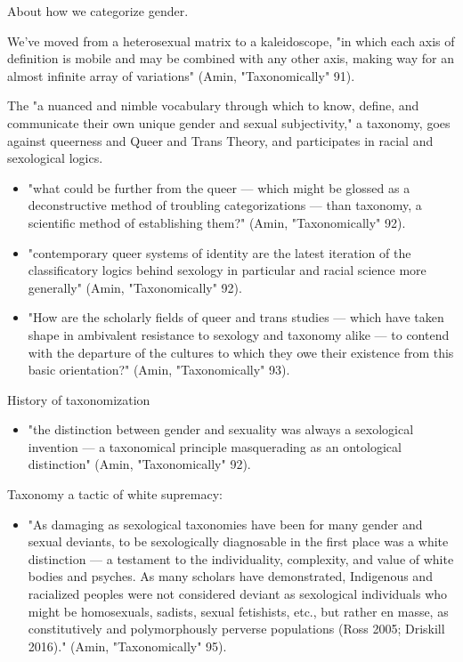 \documentclass[11pt]{article}
\begin{document}
\begin{enumerate}
About how we categorize gender.

We've moved from a heterosexual matrix to a kaleidoscope, "in which
each axis of definition is mobile and may be combined with any other
axis, making way for an almost infinite array of variations" (Amin,
"Taxonomically" 91).

The "a nuanced and nimble vocabulary through which to know, define,
and communicate their own unique gender and sexual subjectivity," a
taxonomy, goes against queerness and Queer and Trans Theory, and
participates in racial and sexological logics. 
\begin{itemize}
\item "what could be further from the queer — which might be glossed as a
deconstructive method of troubling categorizations — than taxonomy,
a scientific method of establishing them?" (Amin, "Taxonomically"
92).
\item "contemporary queer systems of identity are the latest iteration of
the classificatory logics behind sexology in particular and racial
science more generally" (Amin, "Taxonomically" 92).
\item "How are the scholarly fields of queer and trans studies — which
have taken shape in ambivalent resistance to sexology and taxonomy
alike — to contend with the departure of the cultures to which they
owe their existence from this basic orientation?" (Amin,
"Taxonomically" 93).
\end{itemize}

History of taxonomization
\begin{itemize}
\item "the distinction between gender and sexuality was always a
sexological invention — a taxonomical principle masquerading as an
ontological distinction" (Amin, "Taxonomically" 92).
\end{itemize}

Taxonomy a tactic of white supremacy:
\begin{itemize}
\item "As damaging as sexological taxonomies have been for many gender and
sexual deviants, to be sexologically diagnosable in the first place
was a white distinction — a testament to the individuality,
complexity, and value of white bodies and psyches. As many scholars
have demonstrated, Indigenous and racialized peoples were not
considered deviant as sexological individuals who might be
homosexuals, sadists, sexual fetishists, etc., but rather en masse,
as constitutively and polymorphously perverse populations (Ross
2005; Driskill 2016)." (Amin, "Taxonomically" 95).
\end{itemize}


\end{enumerate}
\end{document}
